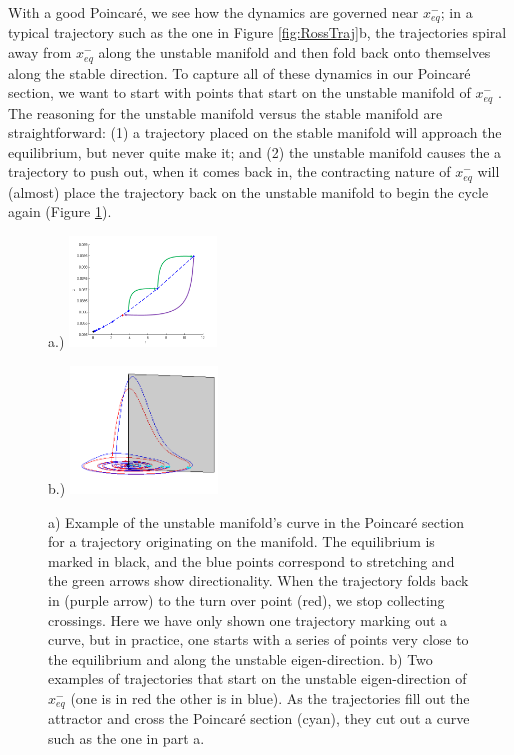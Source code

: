 \documentclass[12 pt]{article}
\begin{document}
With a good Poincar\'e, we see how the dynamics are governed near $x_{eq}^{-}$; in a typical trajectory such as the one in Figure \ref{fig:RossTraj}b, the trajectories spiral away from $x_{eq}^{-}$ along the unstable manifold and then fold back onto themselves along the stable direction.  To capture all of these dynamics in our Poincar\'e section, we want to start with points that start on the unstable manifold of $x_{eq}^{-}$ \cite{Eth}.  The reasoning for the unstable manifold versus the stable manifold are straightforward: (1) a trajectory placed on the stable manifold will approach the equilibrium, but never quite make it; and (2) the unstable manifold causes the a trajectory to push out, when it comes back in, the contracting nature of $x_{eq}^{-}$ will (almost) place the trajectory back on the unstable manifold to begin the cycle again (Figure \ref{fig:RossUnstable}).
\begin{figure}[h]
\centering
a.)  \includegraphics[width=0.35\textwidth]{Figs/Section1/kcsinglettrajectoryalongPSdirection.png}

b.)  \includegraphics[width=0.35\textwidth]{Figs/Section1/kcRosslerUnstableManPSc.png}
\caption{
 a) Example of the unstable manifold's curve in the Poincar\'e section for a trajectory originating on the manifold.  The equilibrium is marked in black, and the blue points correspond to stretching and the green arrows show directionality.  When the trajectory folds back in (purple arrow) to the turn over point (red), we stop collecting crossings.  Here we have only shown one trajectory marking out a curve, but in practice, one starts with a series of points very close to the equilibrium and along the unstable eigen-direction.
b) Two examples of trajectories that start on the unstable eigen-direction of $x_{eq}^{-}$ (one is in red the other is in blue). As the trajectories fill out the attractor and cross the Poincar\'e section (cyan), they cut out a curve such as the one in part a.
}
 \label{fig:RossUnstable}
\end{figure}
\end{document}
